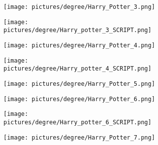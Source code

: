 \begin{figure} \ContinuedFloat
        \centering
        \begin{subfigure}{.49\textwidth}
                \centering
                \texttt{[image: pictures/degree/Harry\_Potter\_3.png]}
        \end{subfigure}
        \begin{subfigure}{.49\textwidth}
                \centering
                \texttt{[image: pictures/degree/Harry\_potter\_3\_SCRIPT.png]}
        \end{subfigure}
\end{figure}
\begin{figure} \ContinuedFloat
        \centering
        \begin{subfigure}{.49\textwidth}
                \centering
                \texttt{[image: pictures/degree/Harry\_Potter\_4.png]}
        \end{subfigure}
        \begin{subfigure}{.49\textwidth}
                \centering
                \texttt{[image: pictures/degree/Harry\_potter\_4\_SCRIPT.png]}
        \end{subfigure}
\end{figure}
\begin{figure} \ContinuedFloat
        \centering
        \begin{subfigure}{.49\textwidth}
                \centering
                \texttt{[image: pictures/degree/Harry\_Potter\_5.png]}
        \end{subfigure}
        \begin{subfigure}{.49\textwidth}
                \centering
                \texttt{[image: pictures/degree/Harry\_Potter\_6.png]}
        \end{subfigure}
\end{figure}
\begin{figure} \ContinuedFloat
        \centering
        \begin{subfigure}{.49\textwidth}
                \centering
                \texttt{[image: pictures/degree/Harry\_potter\_6\_SCRIPT.png]}
        \end{subfigure}
        \begin{subfigure}{.49\textwidth}
                \centering
                \texttt{[image: pictures/degree/Harry\_Potter\_7.png]}
        \end{subfigure}
\end{figure}

